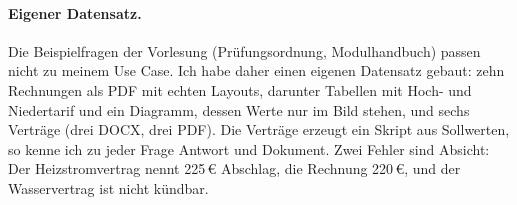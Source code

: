 \paragraph{Eigener Datensatz.} Die Beispielfragen der Vorlesung (Prüfungsordnung, Modulhandbuch) passen nicht zu meinem Use Case. Ich habe daher einen eigenen Datensatz gebaut: zehn Rechnungen als PDF mit echten Layouts, darunter Tabellen mit Hoch- und Niedertarif und ein Diagramm, dessen Werte nur im Bild stehen, und sechs Verträge (drei DOCX, drei PDF). Die Verträge erzeugt ein Skript aus Sollwerten, so kenne ich zu jeder Frage Antwort und Dokument. Zwei Fehler sind Absicht: Der Heizstromvertrag nennt 225\,€ Abschlag, die Rechnung 220\,€, und der Wasservertrag ist nicht kündbar.
